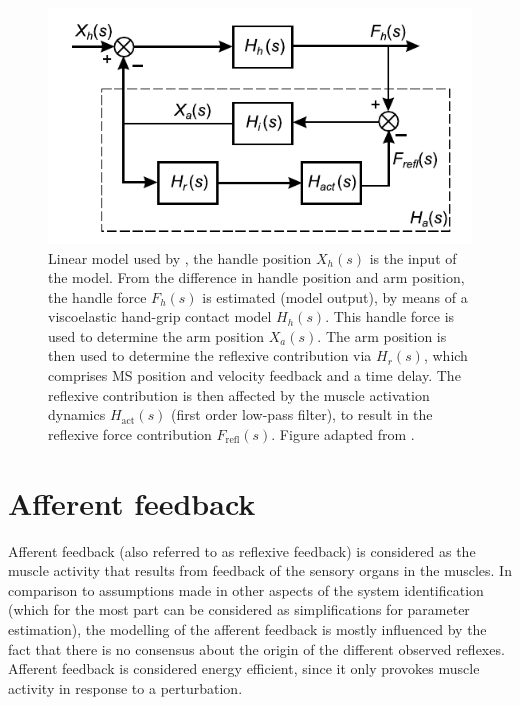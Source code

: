 \begin{figure}[t]
    \centering
    \includegraphics[width=0.6\linewidth]{Figures/models_assumptions/model_helm_2002.pdf}
    \caption{Linear model used by \citeauthor{van_der_helm_identification_2002}, the handle position $X_h(s)$ is the input of the model. From the difference in handle position and arm position, the handle force $F_h(s)$ is estimated (model output), by means of a viscoelastic hand-grip contact model $H_h(s)$. This handle force is used to determine the arm position $X_a(s)$. The arm position is then used to determine the reflexive contribution via $H_r(s)$, which comprises MS position and velocity feedback and a time delay. The reflexive contribution is then affected by the muscle activation dynamics $H_\text{act}(s)$ (first order low-pass filter), to result in the reflexive force contribution $F_\text{refl}(s)$. Figure adapted from \citet{van_der_helm_identification_2002}.}
    \label{fig:model_helm_2002}
\end{figure}




\section{Afferent feedback} \label{sec:ass_afferent}
Afferent feedback (also referred to as reflexive feedback) is considered as the muscle activity that results from feedback of the sensory organs in the muscles. In comparison to assumptions made in other aspects of the system identification (which for the most part can be considered as simplifications for parameter estimation), the modelling of the afferent feedback is mostly influenced by the fact that there is no consensus about the origin of the different observed reflexes. Afferent feedback is considered energy efficient, since it only provokes muscle activity in response to a perturbation. 

